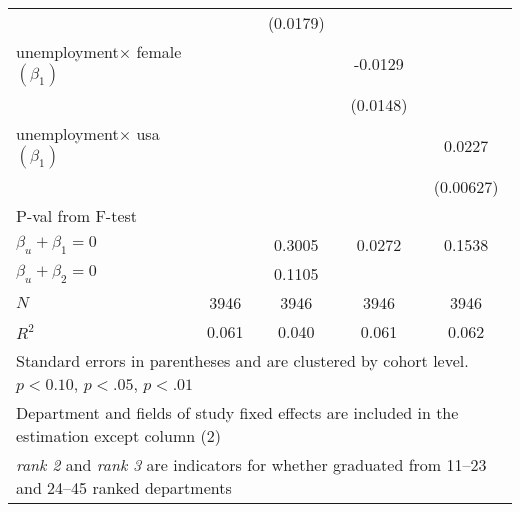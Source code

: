 \begin{table}[ht]
{\begin{tabular}{l*{4}{c}}
            &                     &    (0.0179)         &                     &                     \\
[1em]
unemployment$\times$ female $\left( \beta_1 \right)$&                     &                     &     -0.0129         &                     \\
            &                     &                     &    (0.0148)         &                     \\
[1em]
unemployment$\times$ usa $\left( \beta_1 \right)$&                     &                     &                     &      0.0227\sym{***}\\
            &                     &                     &                     &   (0.00627)         \\
\hline
P-val from F-test &\\
$\beta_u + \beta_1 = 0 $ &                 &        0.3005         &        0.0272         &        0.1538         \\
$\beta_u + \beta_2 = 0$ &                 &        0.1105         &                 &                 \\
\hline
\(N\)       &        3946         &        3946         &        3946         &        3946         \\
\(R^{2}\)   &       0.061         &       0.040         &       0.061         &       0.062         \\
\hline\hline
\multicolumn{5}{l}{\footnotesize Standard errors in parentheses and are clustered by cohort level. \sym{*} \(p<0.10\), \sym{**} \(p<.05\), \sym{***} \(p<.01\)}\\
\multicolumn{5}{l}{\footnotesize Department and fields of study fixed effects are included in the estimation  except column (2)}\\
\multicolumn{5}{l}{\footnotesize \textit{rank 2} and \textit{rank 3} are indicators for whether graduated from 11--23  and 24--45 ranked departments}\\
\end{tabular}%
}
\end{table}